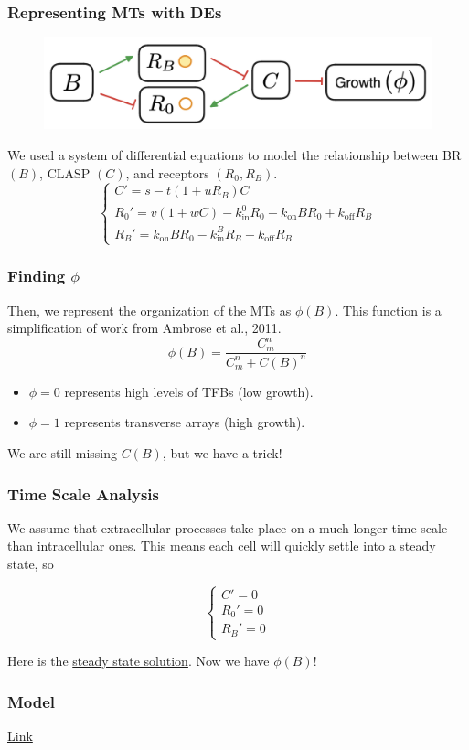 \documentclass{beamer}
\begin{document}
\begin{frame}
\frametitle{Representing MTs with DEs}

\begin{figure}
	\centering
	\includegraphics[scale = 0.3]{fig3.png}
\end{figure}

We used a system of differential equations to model the relationship between BR $(B)$, CLASP $(C)$, and receptors $(R_{0}, R_{B})$.
$$
\begin{cases}
C' = s - t(1 + uR_{B})C \\[5pt]
R_{0}' = v(1 + wC) - k_{\text{in}}^{ 0 }R_{0} - k_{\text{on}}BR_{0} + k_{\text{off}}R_{B} \\[5pt]
R_{B}' = k_{\text{on}}BR_{0} - k_{\text{in}}^{ B }R_{B} - k_{\text{off}}R_{B}
\end{cases}
$$
\end{frame}

\begin{frame}
\frametitle{Finding $\phi$}


Then, we represent the organization of the MTs as $\phi(B)$. This function is a simplification of work from Ambrose et al., 2011.
$$\phi(B) = \frac{C_{m}^{n}}{C_{m}^{n} + C(B)^{n}}$$

\begin{itemize}
	\item $\phi = 0$ represents high levels of TFBs (low growth).
	\item $\phi = 1$ represents transverse arrays (high growth).
\end{itemize}

\bigskip

We are still missing $C(B)$, but we have a trick!

\end{frame}

\begin{frame}
\frametitle{Time Scale Analysis}
We assume that extracellular processes take place on a much longer time scale than intracellular ones. This means each cell will quickly settle into a steady state, so

$$\begin{cases}
C' = 0 \\[5pt] R_{0}' = 0 \\[5pt] R_{B}' = 0
\end{cases}$$


\bigskip

Here is the \textcolor{blue}{\href{https://www.desmos.com/calculator/vcrxd7n1ju}{steady state solution}}. Now we have $\phi(B)$!

\end{frame}


\begin{frame}
\frametitle{Model}

\textcolor{blue}{\href{https://github.com/rileywheadon/plant-growth/blob/master/presentation/model2.gif}{Link}}

\end{frame}
\end{document}
